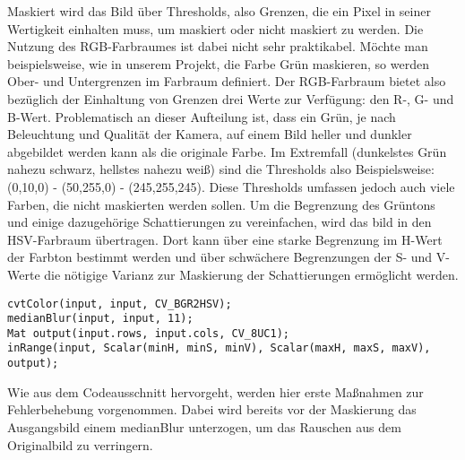 \documentclass[12pt]{article}
\begin{document}
Maskiert wird das Bild über Thresholds, also Grenzen, die ein Pixel in seiner Wertigkeit einhalten muss, um maskiert oder nicht maskiert zu werden. Die Nutzung des RGB-Farbraumes ist dabei nicht sehr praktikabel. Möchte man beispielsweise, wie in unserem Projekt, die Farbe Grün maskieren, so werden Ober- und Untergrenzen im Farbraum definiert. Der RGB-Farbraum bietet also bezüglich der Einhaltung von Grenzen drei Werte zur Verfügung: den R-, G- und B-Wert. Problematisch an dieser Aufteilung ist, dass ein Grün, je nach Beleuchtung und Qualität der Kamera, auf einem Bild heller und dunkler abgebildet werden kann als die originale Farbe. Im Extremfall (dunkelstes Grün nahezu schwarz, hellstes nahezu weiß) sind die Thresholds also Beispielsweise: (0,10,0) - (50,255,0) - (245,255,245). Diese Thresholds umfassen jedoch auch viele Farben, die nicht maskierten werden sollen. Um die Begrenzung des Grüntons und einige dazugehörige Schattierungen zu vereinfachen, wird das bild in den HSV-Farbraum übertragen. Dort kann über eine starke Begrenzung im H-Wert der Farbton bestimmt werden und über schwächere Begrenzungen der S- und V-Werte die nötigige Varianz zur Maskierung der Schattierungen ermöglicht werden.
\begin{lstlisting}
cvtColor(input, input, CV_BGR2HSV);
medianBlur(input, input, 11);
Mat output(input.rows, input.cols, CV_8UC1);
inRange(input, Scalar(minH, minS, minV), Scalar(maxH, maxS, maxV), output);
\end{lstlisting}
Wie aus dem Codeausschnitt hervorgeht, werden hier erste Maßnahmen zur Fehlerbehebung vorgenommen. Dabei wird bereits vor der Maskierung das Ausgangsbild einem medianBlur unterzogen, um das Rauschen aus dem Originalbild zu verringern.
\end{document}
